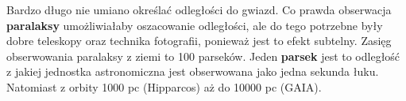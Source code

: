 \documentclass[../index.tex]{subfiles}
\begin{document}
        Bardzo długo nie umiano określać odległości do gwiazd. Co prawda obserwacja \textbf{paralaksy} umożliwiałaby oszacowanie odległości, ale do tego potrzebne były dobre teleskopy oraz technika fotografii, ponieważ jest to efekt subtelny. Zasięg obserwowania paralaksy z ziemi to 100 parseków. Jeden \textbf{parsek} jest to odległość z jakiej jednostka astronomiczna jest obserwowana jako jedna sekunda łuku. Natomiast z orbity 1000 pc (Hipparcos) aż do 10000 pc (GAIA).
\end{document}
